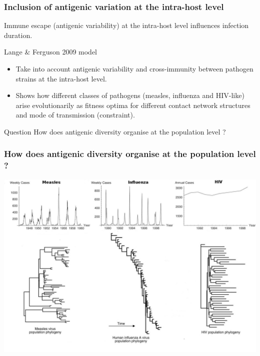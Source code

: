 \documentclass{beamer}
\begin{document}
\begin{frame}
  \frametitle{Inclusion of antigenic variation at the intra-host level}
  
  Immune escape (\alert{antigenic variability}) at the intra-host level influences infection duration.\\
  
  \pause
  \begin{block}{Lange \& Ferguson 2009 model}
    \begin{itemize}
    \item Take into account antigenic variability and
      \alert{cross-immunity between pathogen strains} at the
      intra-host level.
    \item Shows how different classes of pathogens (measles, influenza
      and HIV-like) arise evolutionarily as fitness optima for
      different contact network structures and mode of transmission
      (constraint).
    \end{itemize}
  \end{block}

  \pause
  \begin{alertblock}{Question}
    How does antigenic diversity organise at the population level ?
  \end{alertblock}

\end{frame}

\begin{frame}
  \frametitle{How does antigenic diversity organise at the population level ?}
  
  \begin{center}
    \includegraphics[width=0.9 \linewidth]{graph/phylodynamics_full2.jpg}
  \end{center}

\end{frame}
\end{document}
